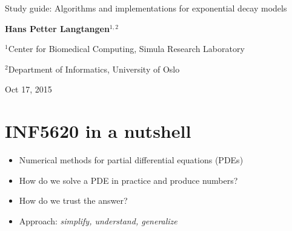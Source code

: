 \documentclass[%
oneside,                 %
final,                   %
10pt]{article}
\begin{document}







\thispagestyle{empty}

\begin{center}
{\LARGE\bf
\begin{spacing}{1.25}
Study guide: Algorithms and implementations for exponential decay models
\end{spacing}
}
\end{center}


\begin{center}
{\bf Hans Petter Langtangen${}^{1, 2}$} \\ [0mm]
\end{center}

\begin{center}
\centerline{{\small ${}^1$Center for Biomedical Computing, Simula Research Laboratory}}
\centerline{{\small ${}^2$Department of Informatics, University of Oslo}}
\end{center}
    

\begin{center}
Oct 17, 2015
\end{center}

\vspace{1cm}


\section*{INF5620 in a nutshell}
\label{5620:about}

\begin{itemize}
 \item Numerical methods for partial differential equations (PDEs)

 \item How do we solve a PDE in practice and produce numbers?

 \item How do we trust the answer?

 \item Approach: \emph{simplify, understand, generalize}
\end{itemize}
\end{document}
